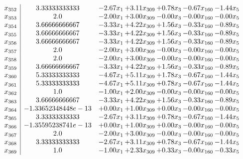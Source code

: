 \documentclass[8pt]{article}
\begin{document}
\[\begin{array}{c| c c@{\hskip 2pt} c@{\hskip 2pt} c@{\hskip 2pt} c@{\hskip 2pt} c@{\hskip 2pt} }
 x_{352}   &  3.33333333333 & -2.67 x_{1} & +  3.11 x_{309} & +  0.78 x_{3} & -0.67 x_{160} & -1.44 x_{5}\\
 x_{353}   &  2.0 & -2.00 x_{1} & +  3.00 x_{309} & -0.00 x_{3} & -0.00 x_{160} & -0.00 x_{5}\\
 x_{354}   &  3.66666666667 & -3.33 x_{1} & +  4.22 x_{309} & +  1.56 x_{3} & -0.33 x_{160} & -0.89 x_{5}\\
 x_{355}   &  3.66666666667 & -3.33 x_{1} & +  4.22 x_{309} & +  1.56 x_{3} & -0.33 x_{160} & -0.89 x_{5}\\
 x_{356}   &  3.66666666667 & -3.33 x_{1} & +  4.22 x_{309} & +  1.56 x_{3} & -0.33 x_{160} & -0.89 x_{5}\\
 x_{357}   &  2.0 & -2.00 x_{1} & +  3.00 x_{309} & -0.00 x_{3} & -0.00 x_{160} & -0.00 x_{5}\\
 x_{358}   &  2.0 & -2.00 x_{1} & +  3.00 x_{309} & -0.00 x_{3} & -0.00 x_{160} & -0.00 x_{5}\\
 x_{359}   &  3.66666666667 & -3.33 x_{1} & +  4.22 x_{309} & +  1.56 x_{3} & -0.33 x_{160} & -0.89 x_{5}\\
 x_{360}   &  5.33333333333 & -4.67 x_{1} & +  5.11 x_{309} & +  1.78 x_{3} & -0.67 x_{160} & -1.44 x_{5}\\
 x_{361}   &  5.33333333333 & -4.67 x_{1} & +  5.11 x_{309} & +  0.78 x_{3} & -0.67 x_{160} & -1.44 x_{5}\\
 x_{362}   &  1.0 & -1.00 x_{1} & +  2.00 x_{309} & -0.00 x_{3} & -0.00 x_{160} & -0.00 x_{5}\\
 x_{363}   &  3.66666666667 & -3.33 x_{1} & +  4.22 x_{309} & +  1.56 x_{3} & -0.33 x_{160} & -0.89 x_{5}\\
 x_{364}   &  -1.33652348448e-13 & +  0.00 x_{1} & +  1.00 x_{309} & +  0.00 x_{3} & -0.00 x_{160} & -0.00 x_{5}\\
 x_{365}   &  3.33333333333 & -2.67 x_{1} & +  3.11 x_{309} & +  0.78 x_{3} & -0.67 x_{160} & -1.44 x_{5}\\
 x_{366}   &  -1.35595238741e-13 & +  0.00 x_{1} & +  1.00 x_{309} & +  0.00 x_{3} & -0.00 x_{160} & -0.00 x_{5}\\
 x_{367}   &  2.0 & -2.00 x_{1} & +  3.00 x_{309} & -0.00 x_{3} & -0.00 x_{160} & -0.00 x_{5}\\
 x_{368}   &  3.33333333333 & -2.67 x_{1} & +  3.11 x_{309} & +  0.78 x_{3} & -0.67 x_{160} & -1.44 x_{5}\\
 x_{369}   &  1.0 & -1.00 x_{1} & +  2.33 x_{309} & +  0.33 x_{3} & -0.00 x_{160} & -0.33 x_{5}\\

\end{array}\]
\end{document}
